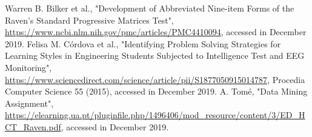 \documentclass[conference]{IEEEtran}
\begin{document}


\begin{thebibliography}{00}
 Warren B. Bilker et al., "Development of Abbreviated Nine-item Forms of the Raven’s Standard Progressive Matrices Test", \url{https://www.ncbi.nlm.nih.gov/pmc/articles/PMC4410094}, accessed in December 2019.
 Felisa M. Córdova et al., "Identifying Problem Solving Strategies for Learning Styles in Engineering Students Subjected to Intelligence Test and EEG Monitoring", \url{https://www.sciencedirect.com/science/article/pii/S1877050915014787}, Procedia Computer Science 55 (2015), accessed in December 2019.
 A. Tomé, "Data Mining Assignment", \url{https://elearning.ua.pt/pluginfile.php/1496406/mod_resource/content/3/ED_HCT_Raven.pdf}, accessed in December 2019.

\end{thebibliography}
\vspace{12pt}
\end{document}
